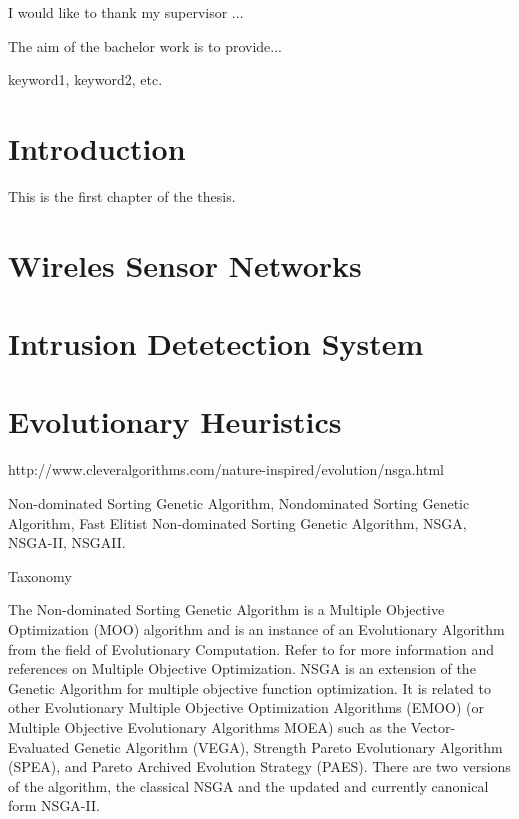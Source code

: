 \documentclass[12pt,oneside,draft]{fithesis2}
\begin{document}
\FrontMatter
\ThesisTitlePage
\begin{ThesisDeclaration}
\DeclarationText
\AdvisorName
\end{ThesisDeclaration}
\begin{ThesisThanks}
I would like to thank my supervisor ...
\end{ThesisThanks}
\begin{ThesisAbstract}
The aim of the bachelor work is to provide...
\end{ThesisAbstract}
\begin{ThesisKeyWords}
keyword1, keyword2, etc.
\end{ThesisKeyWords}

\tableofcontents %

\MainMatter
\chapter{Introduction}
This is the first chapter of the thesis.
\chapter{Wireles Sensor Networks}

\chapter{Intrusion Detetection System}

\chapter{Evolutionary Heuristics}



http://www.cleveralgorithms.com/nature-inspired/evolution/nsga.html

Non-dominated Sorting Genetic Algorithm, Nondominated Sorting Genetic Algorithm, Fast Elitist Non-dominated Sorting Genetic Algorithm, NSGA, NSGA-II, NSGAII.

Taxonomy

The Non-dominated Sorting Genetic Algorithm is a Multiple Objective Optimization (MOO) algorithm and is an instance of an Evolutionary Algorithm from the field of Evolutionary Computation. Refer to for more information and references on Multiple Objective Optimization. NSGA is an extension of the Genetic Algorithm for multiple objective function optimization. It is related to other Evolutionary Multiple Objective Optimization Algorithms (EMOO) (or Multiple Objective Evolutionary Algorithms MOEA) such as the Vector-Evaluated Genetic Algorithm (VEGA), Strength Pareto Evolutionary Algorithm (SPEA), and Pareto Archived Evolution Strategy (PAES). There are two versions of the algorithm, the classical NSGA and the updated and currently canonical form NSGA-II.
\end{document}

